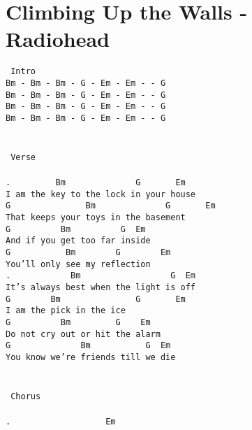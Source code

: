 \newpage
\section{Climbing Up the Walls - Radiohead}
\label{Climbing Up the Walls - Radiohead}
\texttt{\lbrack\ Intro\rbrack\\
Bm\ -\ Bm\ -\ Bm\ -\ G\ -\ Em\ -\ Em\ -\ -\ G\\
Bm\ -\ Bm\ -\ Bm\ -\ G\ -\ Em\ -\ Em\ -\ -\ G\\
Bm\ -\ Bm\ -\ Bm\ -\ G\ -\ Em\ -\ Em\ -\ -\ G\\
Bm\ -\ Bm\ -\ Bm\ -\ G\ -\ Em\ -\ Em\ -\ -\ G\\
\\
\\
\lbrack\ Verse\rbrack\\
\\
. \ \ \ \ \ \ \ \ Bm\ \ \ \ \ \ \ \ \ \ \ \ \ \ G\ \ \ \ \ \ \ Em\\
I\ am\ the\ key\ to\ the\ lock\ in\ your\ house\\
G\ \ \ \ \ \ \ \ \ \ \ \ \ \ \ Bm\ \ \ \ \ \ \ \ \ \ \ \ \ \ G\ \ \ \ \ \ \ Em\\
That\ keeps\ your\ toys\ in\ the\ basement\\
G\ \ \ \ \ \ \ \ \ \ Bm\ \ \ \ \ \ \ \ \ \ G\ \ Em\\
And\ if\ you\ get\ too\ far\ inside\\
G\ \ \ \ \ \ \ \ \ \ \ Bm\ \ \ \ \ \ \ \ G\ \ \ \ \ \ \ \ Em\\
You'll\ only\ see\ my\ reflection\\
. \ \ \ \ \ \ \ \ \ \ \ Bm\ \ \ \ \ \ \ \ \ \ \ \ \ \ \ \ \ \ G\ \ Em\\
It's\ always\ best\ when\ the\ light\ is\ off\\
G\ \ \ \ \ \ \ \ Bm\ \ \ \ \ \ \ \ \ \ \ \ \ \ \ G\ \ \ \ \ \ \ Em\\
I\ am\ the\ pick\ in\ the\ ice\\
G\ \ \ \ \ \ \ \ \ \ Bm\ \ \ \ \ \ \ \ \ G\ \ \ \ Em\\
Do\ not\ cry\ out\ or\ hit\ the\ alarm\\
G\ \ \ \ \ \ \ \ \ \ \ \ \ \ Bm\ \ \ \ \ \ \ \ \ \ \ G\ \ Em\\
You\ know\ we're\ friends\ till\ we\ die\\
\\
\\
\lbrack\ Chorus\rbrack\\
\\
. \ \ \ \ \ \ \ \ \ \ \ \ \ \ \ \ \ \ Em\\
}
